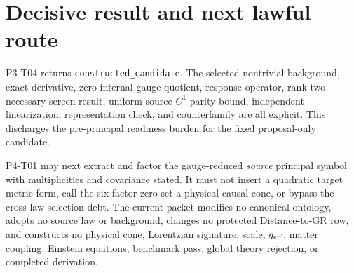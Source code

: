 \documentclass[11pt]{article}
\begin{document}
\section{Decisive result and next lawful route}

P3-T04 returns \texttt{constructed\_candidate}.  The selected nontrivial
background, exact derivative, zero internal gauge quotient, response operator,
rank-two necessary-screen result, uniform source $C^1$ parity bound,
independent linearization, representation check, and counterfamily are all
explicit.  This discharges the pre-principal readiness burden for the fixed
proposal-only candidate.

P4-T01 may next extract and factor the gauge-reduced \emph{source} principal
symbol with multiplicities and covariance stated.  It must not insert a
quadratic target metric form, call the six-factor zero set a physical causal
cone, or bypass the cross-law selection debt.  The current packet modifies no
canonical ontology, adopts no source law or background, changes no protected
Distance-to-GR row, and constructs no physical cone, Lorentzian signature,
scale, $g_{\rm eff}$, matter coupling, Einstein equations, benchmark pass,
global theory rejection, or completed derivation.
\end{document}
